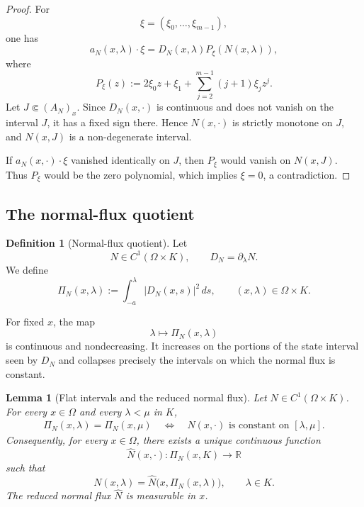 \documentclass[11pt]{amsart}
\numberwithin{equation}{section}
\theoremstyle{plain}
\newtheorem{lemma}[theorem]{Lemma}
\theoremstyle{definition}
\newtheorem{definition}[theorem]{Definition}
\theoremstyle{remark}
\begin{document}
\begin{proof}
For
\[
    \xi=(\xi_0,\ldots,\xi_{m-1}),
\]
one has
\begin{equation}
\label{eq:polynomial-velocity-factorization}
    a_N(x,\lambda)\cdot\xi
    =
    D_N(x,\lambda)P_\xi(N(x,\lambda)),
\end{equation}
where
\[
    P_\xi(z)
    :=
    2\xi_0z+\xi_1
    +\sum_{j=2}^{m-1}(j+1)\xi_jz^j.
\]
Let \(J\Subset(A_N)_x\).  Since \(D_N(x,\cdot)\) is continuous and does not
vanish on the interval \(J\), it has a fixed sign there.  Hence
\(N(x,\cdot)\) is strictly monotone on \(J\), and \(N(x,J)\) is a
non-degenerate interval.

If \(a_N(x,\cdot)\cdot\xi\) vanished identically on \(J\), then
\(P_\xi\) would vanish on \(N(x,J)\).  Thus \(P_\xi\) would be the zero
polynomial, which implies \(\xi=0\), a contradiction.
\end{proof}

\subsection{The normal-flux quotient}
\label{subsec:normal-flux-quotients}

\begin{definition}[Normal-flux quotient]
\label{def:normal-flux-quotient}
Let
\[
    N\in C^1(\Omega\times K),
    \qquad
    D_N=\partial_\lambda N.
\]
We define
\begin{equation}
\label{eq:normal-flux-quotient}
    \Pi_N(x,\lambda)
    :=
    \int_{-a}^{\lambda}
        |D_N(x,s)|^2\,ds,
    \qquad
    (x,\lambda)\in\Omega\times K.
\end{equation}
\end{definition}

For fixed \(x\), the map
\[
    \lambda\longmapsto\Pi_N(x,\lambda)
\]
is continuous and nondecreasing.  It increases on the portions of the state
interval seen by \(D_N\) and collapses precisely the intervals on which the
normal flux is constant.

\begin{lemma}[Flat intervals and the reduced normal flux]
\label{lem:factorization-through-quotient}
Let \(N\in C^1(\Omega\times K)\).  For every \(x\in\Omega\) and every
\(\lambda<\mu\) in \(K\),
\begin{equation}
\label{eq:quotient-flat-equivalence}
\begin{aligned}
    \Pi_N(x,\lambda)=\Pi_N(x,\mu)
    \quad\Longleftrightarrow\quad
    N(x,\cdot)\text{ is constant on }[\lambda,\mu].
\end{aligned}
\end{equation}
Consequently, for every \(x\in\Omega\), there exists a unique continuous
function
\[
    \widehat N(x,\cdot):
    \Pi_N(x,K)\to\mathbb R
\]
such that
\begin{equation}
\label{eq:N-factorization}
    N(x,\lambda)
    =
    \widehat N
    \bigl(x,\Pi_N(x,\lambda)\bigr),
    \qquad
    \lambda\in K.
\end{equation}
The reduced normal flux \(\widehat N\) is measurable in \(x\).
\end{lemma}
\end{document}
